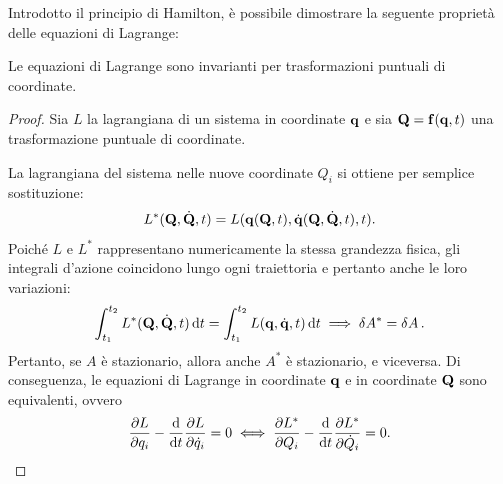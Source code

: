 Introdotto il principio di Hamilton, è possibile dimostrare la seguente proprietà delle equazioni di Lagrange:
\begin{proposition}
    Le equazioni di Lagrange sono invarianti per trasformazioni puntuali di coordinate.
\end{proposition}
\begin{proof}
    Sia $L$ la lagrangiana di un sistema in coordinate $\vb{q}$ e sia $\vb{Q} = \vb{f}(\vb{q}, t)$ una trasformazione puntuale di coordinate.
    
    La lagrangiana del sistema nelle nuove coordinate $Q_i$ si ottiene per semplice sostituzione:
    \begin{equation*}
        L^*(\vb{Q}, \dot{\vb{Q}}, t) = L(\vb{q}(\vb{Q}, t), \dot{\vb{q}}(\vb{Q}, \dot{\vb{Q}}, t), t).
    \end{equation*}
    Poiché $L$ e $L^*$ rappresentano numericamente la stessa grandezza fisica, gli integrali d'azione coincidono lungo ogni traiettoria e pertanto anche le loro variazioni:
    \begin{equation*}
        \int_{t_1}^{t_2} L^*(\vb{Q}, \dot{\vb{Q}}, t) \dd{t} = \int_{t_1}^{t_2} L(\vb{q}, \dot{\vb{q}}, t) \dd{t} \implies \var{A^*} = \var{A}.
    \end{equation*}
    Pertanto, se $A$ è stazionario, allora anche $A^*$ è stazionario, e viceversa. Di conseguenza, le equazioni di Lagrange in coordinate $\vb{q}$ e in coordinate $\vb{Q}$ sono equivalenti, ovvero
    \begin{equation*}
        \pdv{L}{q_i} - \dv{t}\pdv{L}{\dot{q}_i} = 0 \iff \pdv{L^*}{Q_i} - \dv{t}\pdv{L^*}{\dot{Q}_i} = 0.
    \end{equation*}
\end{proof}
